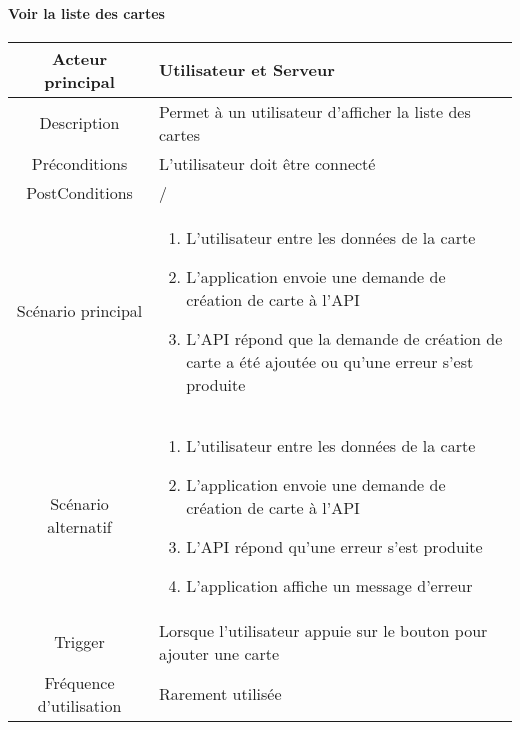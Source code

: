 \documentclass{article}
\begin{document}


\paragraph{Voir la liste des cartes}
    \begin{table}[h]
        \begin{tabular}{|c|p{10cm}|}
        \hline
        Acteur principal& Utilisateur et Serveur \\
        \hline
        Description& Permet à un utilisateur d'afficher la liste des cartes \\
        \hline
        Préconditions& L'utilisateur doit être connecté  \\
        \hline
        PostConditions&  /    \\
        \hline
        Scénario principal& 
                \begin{enumerate}
                    \item L'utilisateur entre les données de la carte
                    \item L'application envoie une demande de création de carte à l'API
                    \item L'API répond que la demande de création de carte a été ajoutée ou qu'une erreur s'est produite
                \end{enumerate}     \\
        \hline
        Scénario alternatif& 
            \begin{enumerate}
                \item L'utilisateur entre les données de la carte
                \item L'application envoie une demande de création de carte à l'API
                \item L'API répond qu'une erreur s'est produite
                \item L'application affiche un message d'erreur
            \end{enumerate}     \\
        \hline
        Trigger&  Lorsque l'utilisateur appuie sur le bouton pour ajouter une carte   \\
        \hline
        Fréquence d'utilisation& Rarement utilisée  \\
        \hline
        \end{tabular}
    \end{table}
\end{document}

